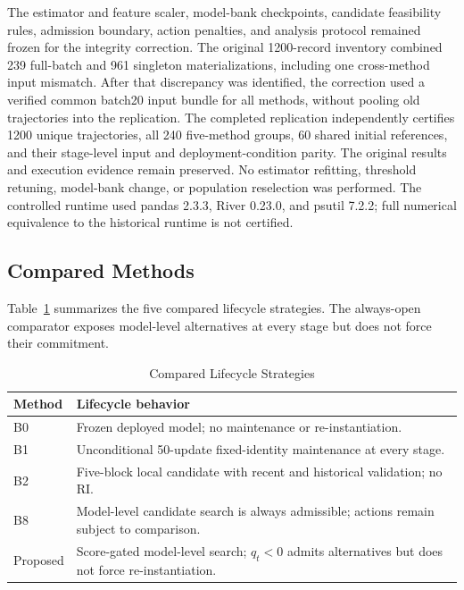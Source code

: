 \documentclass[journal]{IEEEtran}
\begin{document}
The estimator and feature scaler, model-bank checkpoints, candidate
feasibility rules, admission boundary, action penalties, and analysis
protocol remained frozen for the integrity correction. The original
1200-record inventory combined 239 full-batch and 961 singleton
materializations, including one cross-method input mismatch. After
that discrepancy was identified, the correction used a verified common
batch20 input bundle for all methods, without pooling old trajectories
into the replication. The completed replication independently certifies
1200 unique trajectories, all 240 five-method groups, 60 shared initial
references, and their stage-level input and deployment-condition parity.
The original results and execution evidence remain preserved.
No estimator refitting, threshold retuning, model-bank change, or
population reselection was performed. The controlled runtime used
pandas 2.3.3, River 0.23.0, and psutil 7.2.2; full numerical
equivalence to the historical runtime is not certified.

\subsection{Compared Methods}
Table~\ref{tab:methods} summarizes the five compared lifecycle
strategies. The always-open comparator exposes model-level
alternatives at every stage but does not force their commitment.

\begin{table}[!b]
\caption{Compared Lifecycle Strategies}
\label{tab:methods}
\centering
\footnotesize
\begin{tabular}{p{}p{}}
\toprule
Method & Lifecycle behavior \\
\midrule
B0 & Frozen deployed model; no maintenance or re-instantiation. \\
B1 & Unconditional 50-update fixed-identity maintenance at every stage. \\
B2 & Five-block local candidate with recent and historical validation; no RI. \\
B8 & Model-level candidate search is always admissible; actions remain subject to comparison. \\
Proposed & Score-gated model-level search; $q_t<0$ admits alternatives but does not force re-instantiation. \\
\bottomrule
\end{tabular}
\end{table}
\end{document}
